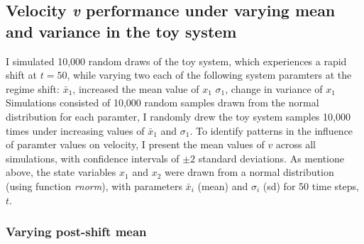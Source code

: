 \documentclass[12pt,twoside,openany]{reedthesis}
\begin{document}
\hypertarget{velocity-v-performance-under-varying-mean-and-variance-in-the-toy-system}{%
\subsection{\texorpdfstring{Velocity \emph{v} performance under varying mean and variance in the toy system}{Velocity v performance under varying mean and variance in the toy system}}\label{velocity-v-performance-under-varying-mean-and-variance-in-the-toy-system}}

I simulated 10,000 random draws of the toy system, which experiences a rapid shift at \(t = 50\), while varying two each of the following system paramters at the regime shift:
\(\bar{x}_1\), increased the mean value of \(x_1\)
\(\sigma_1\), change in variance of \(x_1\)
Simulations consisted of 10,000 random samples drawn from the normal distribution for each paramter, I randomly drew the toy system samples 10,000 times under increasing values of \(\bar{x}_1\) and \(\sigma_1\). To identify patterns in the influence of paramter values on velocity, I present the mean values of \(v\) across all simulations, with confidence intervals of \(\pm 2\) standard deviations. As mentione above, the state variables \(x_1\) and \(x_2\) were drawn from a normal distribution (using function \emph{rnorm}), with parameters \(\bar{x}_i\) (mean) and \(\sigma_i\) (sd) for 50 time steps, \(t\).

\hypertarget{varying-post-shift-mean}{%
\subsubsection{Varying post-shift mean}\label{varying-post-shift-mean}}
\end{document}
